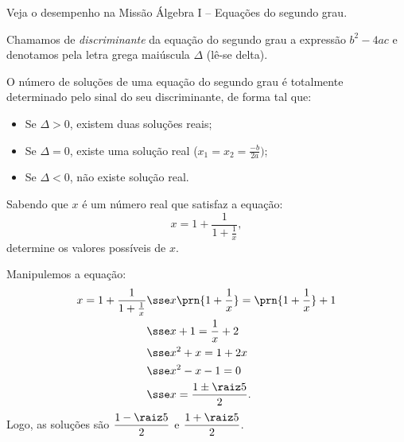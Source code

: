 \begin{onlineact}
Veja o desempenho na Missão Álgebra I -- Equações do segundo grau.
\end{onlineact}

\begin{definition}
    Chamamos de \emph{discriminante} da equação do segundo grau a expressão $b^2 - 4ac$ e denotamos pela letra grega maiúscula $\Delta$ (lê-se delta).
\end{definition}

\begin{remark}
    O número de soluções de uma equação do segundo grau é totalmente determinado pelo sinal do seu discriminante, de forma tal que:
    \begin{itemize}
        \item Se $\Delta > 0$, existem duas soluções reais;
        \item Se $\Delta = 0 $, existe uma solução real ($x_1 = x_2 = \frac{-b}{2a})$;
        \item Se $\Delta < 0$, não existe solução real.
    \end{itemize}
\end{remark}

\begin{example}
    Sabendo que $x$ é um número real que satisfaz a equação:
    \[
        x = 1 + \frac 1 {1 + \frac 1 x},
    \]
    determine os valores possíveis de $x$.
\end{example}

\begin{solution}
    Manipulemos a equação:
    \begin{align*}
        x = 1 + \dfrac 1 {1 + \frac 1 x} & \sse x \prn{1 + \dfrac 1 x } = \prn{ 1 + \dfrac 1 x }+1 \\
                                         & \sse x + 1 = \dfrac 1 x + 2 \\
                                         & \sse x^2 + x = 1 + 2x \\
                                         & \sse x^2 - x - 1 = 0 \\
                                         & \sse x = \dfrac{1 \pm\raiz 5} 2.
    \end{align*}
    Logo, as soluções são $\dfrac {1 - \raiz 5} 2$ e $\dfrac { 1 + \raiz 5 } 2$.
\end{solution}

